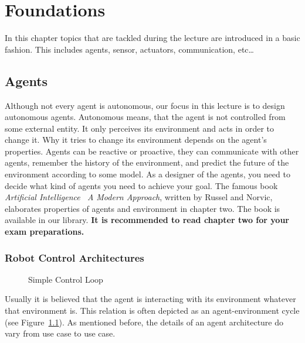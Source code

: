 \chapter{Foundations}
\label{chap:foundations}

In this chapter topics that are tackled during the lecture are introduced in a basic fashion. This includes agents, sensor, actuators, communication, etc\dots

\section{Agents}
\label{sec:agents}

Although not every agent is autonomous, our focus in this lecture is to design autonomous agents. Autonomous means, that the agent is not controlled from some external entity. It only perceives its environment and acts in order to change it. Why it tries to change its environment depends on the agent's properties. Agents can be reactive or proactive, they can communicate with other agents, remember the history of the environment, and predict the future of the environment according to some model. As a designer of the agents, you need to decide what kind of agents you need to achieve your goal. The famous book \emph{Artificial Intelligence \textendash\ A Modern Approach}, written by Russel and Norvic, elaborates properties of agents and environment in chapter two. The book is available in our library. \textbf{It is recommended to read chapter two for your exam preparations.}

\subsection{Robot Control Architectures}
\label{ssec:robotcontrolarch}

\begin{figure}[htbp]
  \centering
  \caption{Simple Control Loop}
  \label{fig:simplecontrolloop}
\end{figure}

Usually it is believed that the agent is interacting with its environment \textendash whatever that environment is. This relation is often depicted as an agent-environment cycle (see Figure~\ref{fig:simplecontrolloop}). As mentioned before, the details of an agent architecture do vary from use case to use case.

